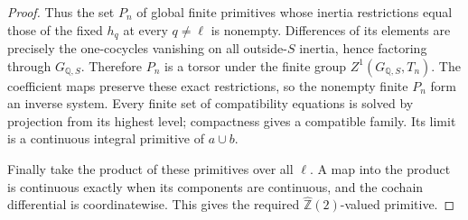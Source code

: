 \begin{proof}
Thus the set \(P_n\) of global finite primitives
whose inertia restrictions equal those of the fixed
\(h_q\) at every \(q\ne\ell\) is nonempty. Differences
of its elements are precisely the one-cocycles
vanishing on all outside-\(S\) inertia, hence factoring
through \(G_{\mathbb Q,S}\). Therefore \(P_n\) is a
torsor under the finite group \(Z^1(G_{\mathbb Q,S},T_n)\).
The coefficient maps preserve these exact restrictions,
so the nonempty finite \(P_n\) form an inverse system.
Every finite set of compatibility equations is solved
by projection from its highest level; compactness gives
a compatible family. Its limit is a continuous
integral primitive of \(a\cup b\).

Finally take the product of these primitives over all
\(\ell\). A map into the product is continuous exactly
when its components are continuous, and the cochain
differential is coordinatewise. This gives the required
\(\widehat{\mathbb Z}(2)\)-valued primitive.
\end{proof}

